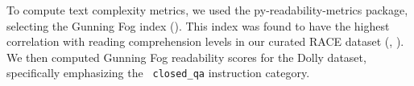 To compute text complexity metrics, we used the py-readability-metrics package, selecting the Gunning Fog index (\cite{wiki:gunning_fog}). This index was found to have the highest correlation with reading comprehension levels in our curated RACE dataset (\cite{lai2017race}, \cite{pmlr-v101-liang19a}). We then computed Gunning Fog readability scores for the Dolly dataset, specifically emphasizing the \texttt{ closed\_qa} instruction category.

